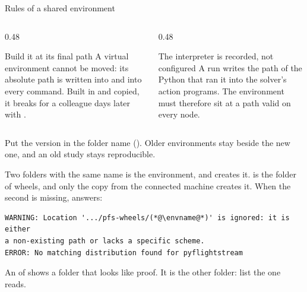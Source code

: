 \documentclass[aspectratio=169,11pt]{beamer}
\begin{document}
\begin{frame}{Rules of a shared environment}
\begin{columns}[T]
\begin{column}{0.48\textwidth}
\begin{alertblock}{Build it at its final path}
\small A virtual environment cannot be moved: its absolute path is written
into  and into every command. Built in  and copied,
it breaks for a colleague days later with .
\end{alertblock}
\end{column}
\begin{column}{0.48\textwidth}
\begin{block}{The interpreter is recorded, not configured}
\small A run writes the path of the Python that ran it into the solver's
action programs. The environment must therefore sit at a path valid on every
node.
\end{block}
\end{column}
\end{columns}
\vspace{2mm}
\begin{takeaway}Put the version in the folder name (\code{\envname}). Older
environments stay beside the new one, and an old study stays
reproducible.\end{takeaway}
\end{frame}

\begin{frame}[fragile]{Two folders with the same name}
\small {} is the environment, and  creates it.
 is the folder of wheels, and only the copy from the
connected machine creates it. When the second is missing,  answers:
\begin{lstlisting}[style=ftsbase]
WARNING: Location '.../pfs-wheels/(*@\envname@*)' is ignored: it is either
a non-existing path or lacks a specific scheme.
ERROR: No matching distribution found for pyflightstream
\end{lstlisting}
\begin{takeaway}An  of  shows a folder that looks like
proof. It is the other folder: list the one  reads.\end{takeaway}
\end{frame}
\end{document}
